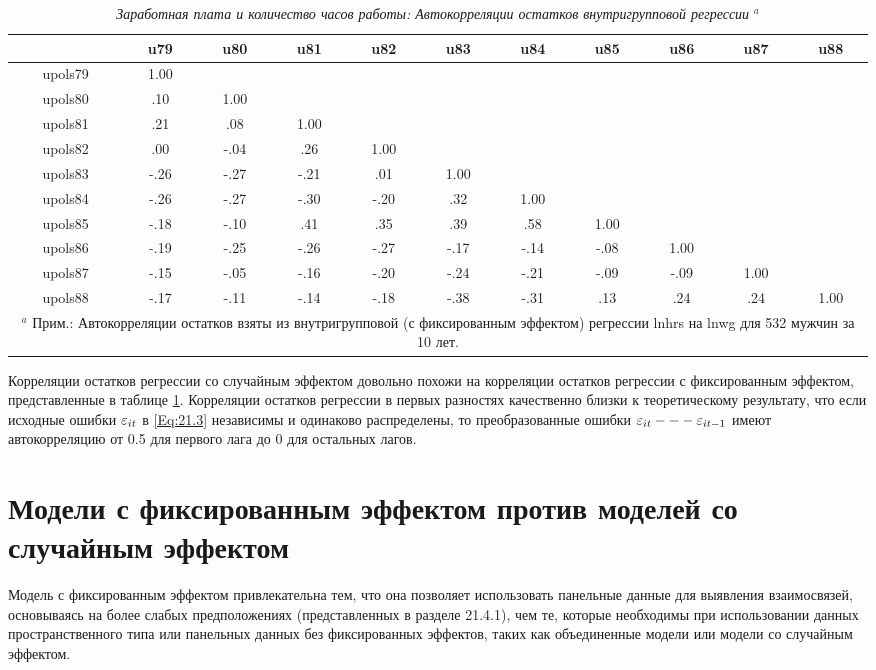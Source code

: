 \begin{table}[ht]
\caption{{\it Заработная плата и количество часов работы: Автокорреляции остатков внутригрупповой регрессии} ${}^a$} 
\centering
\begin{tabular}{ccccccccccc}
\hline \hline
	&	\textbf{u79} & \textbf{u80} & \textbf{u81} & \textbf{u82} & \textbf{u83} & \textbf{u84} & \textbf{u85} & \textbf{u86} & \textbf{u87} & \textbf{u88}  \\
\hline
upols79 & 1.00 & & & & & & & & & \\
upols80 & .10 	& 1.00 & & & & & & & & \\
upols81 & .21	& .08 & 1.00 & & & & & & & \\
upols82 & .00	& -.04 & .26 & 1.00 & & & & & & \\
upols83 & -.26& -.27 & -.21 & .01 & 1.00 & & & & & \\
upols84 & -.26& -.27 & -.30 & -.20 & .32 & 1.00 & & & & \\
upols85 & -.18& -.10 & .41 & .35 & .39 & .58 & 1.00 & & & \\
upols86 & -.19& -.25 & -.26 & -.27 & -.17 & -.14 & -.08 & 1.00 & & \\
upols87 & -.15& -.05 & -.16 & -.20 & -.24 & -.21 & -.09 & -.09 & 1.00 & \\
upols88 & -.17& -.11 & -.14 & -.18 & -.38 & -.31 & .13 & .24 & .24 &  1.00\\
\hline \hline
\multicolumn{11}{p{15cm}}{${}^a$ Прим.: Автокорреляции остатков взяты из внутригрупповой (с фиксированным эффектом) регрессии lnhrs на lnwg для 532 мужчин за 10 лет.}
\end{tabular}
\label{Tab:21.4}
\end{table}

Корреляции остатков регрессии со случайным эффектом довольно похожи на корреляции остатков регрессии с фиксированным эффектом, представленные в таблице \ref{Tab:21.4}. Корреляции остатков регрессии в первых разностях качественно близки к теоретическому результату, что если исходные ошибки $\varepsilon_{it}$ в \ref{Eq:21.3} независимы и одинаково распределены, то преобразованные ошибки $\varepsilon_{it} --- \varepsilon_{it-1}$ имеют автокорреляцию от 0.5 для первого лага до 0 для остальных лагов.

\section{Модели с фиксированным эффектом против моделей со случайным эффектом}

Модель с фиксированным эффектом привлекательна тем, что она позволяет использовать панельные данные для выявления взаимосвязей, основываясь на более слабых предположениях (представленных в разделе 21.4.1), чем те, которые необходимы при использовании данных пространственного типа или панельных данных без фиксированных эффектов, таких как объединенные модели или модели со случайным эффектом.

